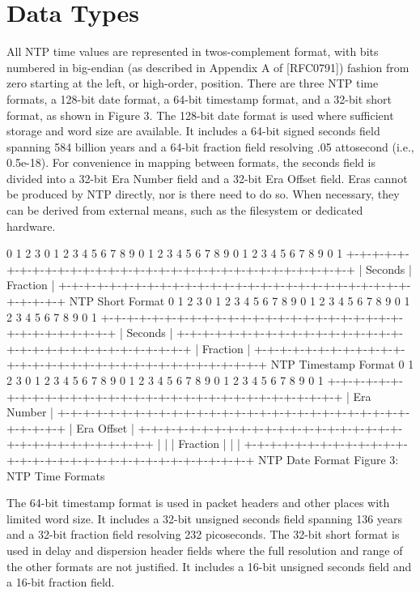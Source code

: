 \chapter{Data Types}

All NTP time values are represented in twos-complement format, with
bits numbered in big-endian (as described in Appendix A of [RFC0791])
fashion from zero starting at the left, or high-order, position.
There are three NTP time formats, a 128-bit date format, a 64-bit
timestamp format, and a 32-bit short format, as shown in Figure 3.
The 128-bit date format is used where sufficient storage and word
size are available. It includes a 64-bit signed seconds field
spanning 584 billion years and a 64-bit fraction field resolving .05
attosecond (i.e., 0.5e-18). For convenience in mapping between
formats, the seconds field is divided into a 32-bit Era Number field
and a 32-bit Era Offset field. Eras cannot be produced by NTP
directly, nor is there need to do so. When necessary, they can be
derived from external means, such as the filesystem or dedicated
hardware.

0 1 2 3
0 1 2 3 4 5 6 7 8 9 0 1 2 3 4 5 6 7 8 9 0 1 2 3 4 5 6 7 8 9 0 1
+-+-+-+-+-+-+-+-+-+-+-+-+-+-+-+-+-+-+-+-+-+-+-+-+-+-+-+-+-+-+-+-+
| Seconds | Fraction |
+-+-+-+-+-+-+-+-+-+-+-+-+-+-+-+-+-+-+-+-+-+-+-+-+-+-+-+-+-+-+-+-+
NTP Short Format
0 1 2 3
0 1 2 3 4 5 6 7 8 9 0 1 2 3 4 5 6 7 8 9 0 1 2 3 4 5 6 7 8 9 0 1
+-+-+-+-+-+-+-+-+-+-+-+-+-+-+-+-+-+-+-+-+-+-+-+-+-+-+-+-+-+-+-+-+
| Seconds |
+-+-+-+-+-+-+-+-+-+-+-+-+-+-+-+-+-+-+-+-+-+-+-+-+-+-+-+-+-+-+-+-+
| Fraction |
+-+-+-+-+-+-+-+-+-+-+-+-+-+-+-+-+-+-+-+-+-+-+-+-+-+-+-+-+-+-+-+-+
NTP Timestamp Format
0 1 2 3
0 1 2 3 4 5 6 7 8 9 0 1 2 3 4 5 6 7 8 9 0 1 2 3 4 5 6 7 8 9 0 1
+-+-+-+-+-+-+-+-+-+-+-+-+-+-+-+-+-+-+-+-+-+-+-+-+-+-+-+-+-+-+-+-+
| Era Number |
+-+-+-+-+-+-+-+-+-+-+-+-+-+-+-+-+-+-+-+-+-+-+-+-+-+-+-+-+-+-+-+-+
| Era Offset |
+-+-+-+-+-+-+-+-+-+-+-+-+-+-+-+-+-+-+-+-+-+-+-+-+-+-+-+-+-+-+-+-+
| |
| Fraction |
| |
+-+-+-+-+-+-+-+-+-+-+-+-+-+-+-+-+-+-+-+-+-+-+-+-+-+-+-+-+-+-+-+-+
NTP Date Format
Figure 3: NTP Time Formats

The 64-bit timestamp format is used in packet headers and other
places with limited word size. It includes a 32-bit unsigned seconds
field spanning 136 years and a 32-bit fraction field resolving 232
picoseconds. The 32-bit short format is used in delay and dispersion
header fields where the full resolution and range of the other
formats are not justified. It includes a 16-bit unsigned seconds
field and a 16-bit fraction field.

